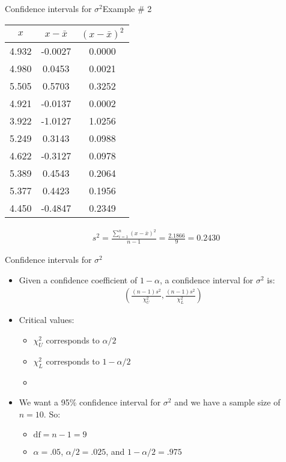 \documentclass[xcolor=dvipsnames]{beamer}
\begin{document}
\begin{frame}{Confidence intervals for $\sigma^2$}{Example \# 2}
	\begin{center}
			\begin{tabular}{|c|c|c|}
			\hline
			$x$  &   $x-\bar{x}$ & $(x-\bar{x})^2$ \\ \hline \hline
			4.932 & -0.0027& 0.0000 \\ \hline
			4.980&  0.0453& 0.0021 \\ \hline
			5.505&  0.5703& 0.3252 \\ \hline
			4.921& -0.0137& 0.0002 \\ \hline
			3.922& -1.0127& 1.0256 \\ \hline
			5.249&  0.3143& 0.0988 \\ \hline
			4.622& -0.3127& 0.0978 \\ \hline
			5.389&  0.4543& 0.2064 \\ \hline
			5.377&  0.4423& 0.1956 \\ \hline
			4.450& -0.4847& 0.2349 \\ \hline
		\end{tabular}
	\end{center}
	\begin{gather*}
		s^2 = \frac{\sum_{i=1}^n (x-\bar{x})^2}{n-1} =\frac{2.1866}{9} =  0.2430
	\end{gather*}
\end{frame}

\begin{frame}{Confidence intervals for $\sigma^2$}
	\begin{itemize}
		\item Given a confidence coefficient of $1-\alpha$, a confidence interval for $\sigma^2$ is:
		\begin{gather*}
		\left(\frac{(n-1) s^2}{\chi_U^2}, \frac{(n-1)s^2}{\chi_L^2} \right)
		\end{gather*}
		\item Critical values:
		\begin{itemize}
			\item $\chi^2_U$ corresponds to $\alpha / 2$
			\item $\chi^2_L$ corresponds to $1 - \alpha / 2$
			\item[]
		\end{itemize} \pause
		\item We want a 95\% confidence interval for $\sigma^2$ and we have a sample size of $n = 10$. So: \pause
		\begin{itemize}
			\item  $\text{df} = n-1 = 9$ \pause
			\item $\alpha = .05$, $\alpha / 2 = .025$, and $1-\alpha / 2 = .975$
		\end{itemize}
	\end{itemize}
\end{frame}
\end{document}

